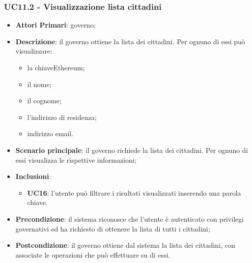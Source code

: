 \subsubsection{UC11.2 - Visualizzazione lista cittadini}
\begin{itemize}
	\item \textbf{Attori Primari}: governo;
	\item \textbf{Descrizione}: il governo ottiene la lista dei cittadini. Per ognuno di essi può visualizzare:
	\begin{itemize}
		\item la chiave\glosp Ethereum\glo;
		\item il nome;
		\item il cognome;
		\item l'indirizzo di residenza;
		\item indirizzo email.
	\end{itemize}
	\item \textbf{Scenario principale}: il governo richiede la lista dei cittadini. Per ognuno di essi visualizza le rispettive informazioni;
	\item \textbf{Inclusioni}:
	\begin{itemize}
		\item \textbf{UC16}: l'utente può filtrare i risultati visualizzati inserendo una parola chiave.
	\end{itemize}
	\item \textbf{Precondizione}: il sistema riconosce che l'utente è autenticato con privilegi governativi ed ha richiesto di ottenere la lista di tutti i cittadini;
	\item \textbf{Postcondizione}: il governo ottiene dal sistema la lista dei cittadini, con associate le operazioni che può effettuare su di essi.
\end{itemize}


